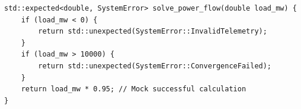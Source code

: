 \begin{verbatim}
std::expected<double, SystemError> solve_power_flow(double load_mw) {
    if (load_mw < 0) {
        return std::unexpected(SystemError::InvalidTelemetry);
    }
    if (load_mw > 10000) {
        return std::unexpected(SystemError::ConvergenceFailed);
    }
    return load_mw * 0.95; // Mock successful calculation
}
\end{verbatim}
